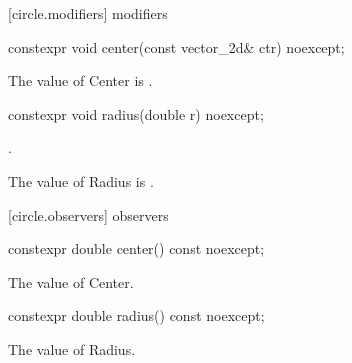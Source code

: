  [circle.modifiers]{ modifiers}

\begin{itemdecl}
constexpr void center(const vector_2d& ctr) noexcept;
\end{itemdecl}

\begin{itemdescr}
\pnum
\effects
The value of Center is .
\end{itemdescr}

\begin{itemdecl}
constexpr void radius(double r) noexcept;
\end{itemdecl}
\begin{itemdescr}
\requires
{}.

\pnum
\effects
The value of Radius is .
\end{itemdescr}

 [circle.observers]{ observers}

\begin{itemdecl}
constexpr double center() const noexcept;
\end{itemdecl}
\begin{itemdescr}
\pnum
\returns
The value of Center.
\end{itemdescr}

\begin{itemdecl}
constexpr double radius() const noexcept;
\end{itemdecl}
\begin{itemdescr}
\pnum
\returns
The value of Radius.
\end{itemdescr}
